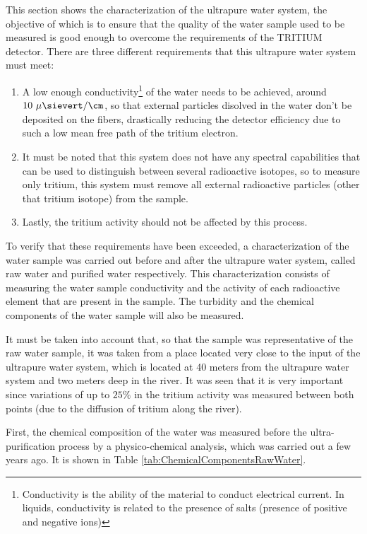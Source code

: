 This section shows the characterization of the ultrapure water system, the objective of which is to ensure that the quality of the water sample used to be measured is good enough to overcome the requirements of the TRITIUM detector. There are three different requirements that this ultrapure water system must meet:

\begin{enumerate}
\item{} A low enough conductivity\footnote{Conductivity is the ability of the material to conduct electrical current. In liquids, conductivity is related to the presence of salts (presence of positive and negative ions)} of the water needs to be achieved, around $10~\mu\sievert/\cm$, so that external particles disolved in the water don't be deposited on the fibers, drastically reducing the detector efficiency due to such a low mean free path of the tritium electron.

\item{} It must be noted that this system does not have any spectral capabilities that can be used to distinguish between several radioactive isotopes, so to measure only tritium, this system must remove all external radioactive particles (other that tritium isotope) from the sample.

\item{} Lastly, the tritium activity should not be affected by this process. 

\end{enumerate}

To verify that these requirements have been exceeded, a characterization of the water sample was carried out before and after the ultrapure water system, called raw water and purified water respectively. This characterization consists of measuring the water sample conductivity and the activity of each radioactive element that are present in the sample. The turbidity and the chemical components of the water sample will also be measured.

It must be taken into account that, so that the sample was representative of the raw water sample, it was taken from a place located very close to the input of the ultrapure water system, which is located at 40 meters from the ultrapure water system and two meters deep in the river. It was seen that it is very important since variations of up to $25\%$ in the tritium activity was measured between both points (due to the diffusion of tritium along the river).

First, the chemical composition of the water was measured before the ultra-purification process by a physico-chemical analysis, which was carried out a few years ago. It is shown in Table \ref{tab:ChemicalComponentsRawWater}.

